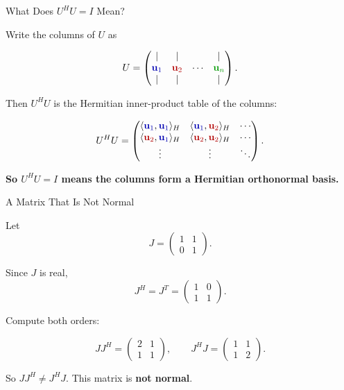 \documentclass[10pt]{beamer}
\theoremstyle{definition}
\newcommand{\x}[1]{\alert{\textbf{#1}}}
\newcommand{\rd}[1]{{\color{red!70!black}#1}}
\newcommand{\bl}[1]{{\color{blue!70!black}#1}}
\newcommand{\gn}[1]{{\color{green!60!black}#1}}
\begin{document}
\begin{frame}{What Does $U^HU=I$ Mean?}

Write the columns of $U$ as

$$
U=\begin{pmatrix}|&|& &|\\
\bl{\mathbf u_1}&\rd{\mathbf u_2}&\cdots&\gn{\mathbf u_n}\\
|&|& &|
\end{pmatrix}.
$$

\vfill\pause

Then $U^HU$ is the Hermitian inner-product table of the columns:

$$
U^HU=
\begin{pmatrix}
\langle \bl{\mathbf u_1},\bl{\mathbf u_1}\rangle_H & \langle \bl{\mathbf u_1},\rd{\mathbf u_2}\rangle_H & \cdots\\
\langle \rd{\mathbf u_2},\bl{\mathbf u_1}\rangle_H & \langle \rd{\mathbf u_2},\rd{\mathbf u_2}\rangle_H & \cdots\\
\vdots&\vdots&\ddots
\end{pmatrix}.
$$

\vfill

\x{So $U^HU=I$ means the columns form a Hermitian orthonormal basis.}

\end{frame}


\begin{frame}{A Matrix That Is Not Normal}

Let
$$
J=\begin{pmatrix}1&1\\0&1\end{pmatrix}.
$$

\vfill

Since $J$ is real,
$$
J^H=J^T=\begin{pmatrix}1&0\\1&1\end{pmatrix}.
$$

\vfill\pause

Compute both orders:

$$
JJ^H=\begin{pmatrix}2&1\\1&1\end{pmatrix},
\qquad
J^HJ=\begin{pmatrix}1&1\\1&2\end{pmatrix}.
$$

\vfill

So $JJ^H\ne J^HJ$. This matrix is \x{not normal}.

\end{frame}
\end{document}
